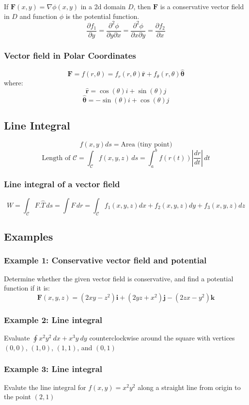 If $\mathbf{F}(x,y)=\nabla\phi(x,y)$ in a 2d domain $D$, then $\mathbf{F}$ is a conservative vector field in $D$ and function $\phi$ is the potential function.
$${\frac{\partial f_{1}}{\partial y}}={\frac{\partial^{2}\phi}{\partial y\partial x}}={\frac{\partial^{2}\phi}{\partial x\partial y}}={\frac{\partial f_{2}}{\partial x}}$$
\subsubsection{Vector field in Polar Coordinates}
$$\mathbf{F}=f(r,\theta)=f_{r}(r,\theta)\mathbf{\hat{r}}+f_{\theta}(r,\theta)\mathbf{\hat{\theta}}$$
where:
$$\mathbf{\hat{r}}=\cos(\theta)i+\sin(\theta)j$$
$$\mathbf{\hat{\theta}}=-\sin(\theta)i+\cos(\theta)j$$
\subsection{Line Integral}
$$f(x,y)ds=\text{Area (tiny point)}$$
$$\text{Length of }\mathcal{C}=\int _{\mathcal{C}}f(x,y,z) \, ds=\int_{a}^{b}f(r(t)) \left|\frac{ dr }{ dt } \right| \, dt  $$
\subsubsection{Line integral of a vector field}
$$W=\int _{\mathcal{C}}F.\hat{T} \, ds =\int F \,dr =\int _{\mathcal{C}}f_{1}(x,y,z)dx+f_{2}(x,y,z)dy+f_{3}(x,y,z)dz $$
\subsection{Examples}
\subsubsection{Example 1: Conservative vector field and potential}
Determine whether the given vector field is conservative, and find a potential
function if it is:
$$\mathbf{F}(x,y,z)=( 2x y-z^{2})\mathbf{i}+( 2y z+ x^{2})\mathbf{j}-(2z x- y^{2})\mathbf{k}$$ 
\subsubsection{Example 2: Line integral}
Evaluate $\oint x^2y^2 \ dx + x^3y\ dy$ counterclockwise around the square with vertices
$(0,0)$, $(1,0)$, $(1, 1)$, and $(0, 1)$
\subsubsection{Example 3: Line integral}
Evalute the line integral for $f(x,y)=x^2y^2$ along a straight line from origin to the point $(2,1)$

